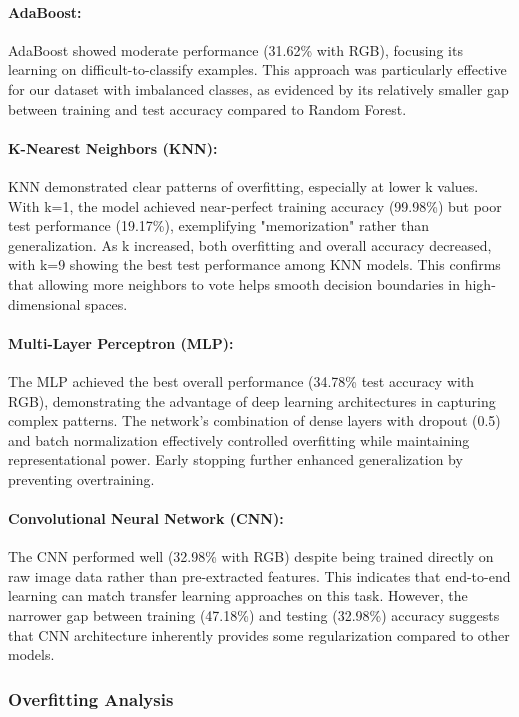 \documentclass{article}
\begin{document}
\paragraph{AdaBoost:}
AdaBoost showed moderate performance (31.62\% with RGB), focusing its learning on difficult-to-classify examples. This approach was particularly effective for our dataset with imbalanced classes, as evidenced by its relatively smaller gap between training and test accuracy compared to Random Forest.

\paragraph{K-Nearest Neighbors (KNN):}
KNN demonstrated clear patterns of overfitting, especially at lower k values. With k=1, the model achieved near-perfect training accuracy (99.98\%) but poor test performance (19.17\%), exemplifying "memorization" rather than generalization. As k increased, both overfitting and overall accuracy decreased, with k=9 showing the best test performance among KNN models. This confirms that allowing more neighbors to vote helps smooth decision boundaries in high-dimensional spaces.

\paragraph{Multi-Layer Perceptron (MLP):}
The MLP achieved the best overall performance (34.78\% test accuracy with RGB), demonstrating the advantage of deep learning architectures in capturing complex patterns. The network's combination of dense layers with dropout (0.5) and batch normalization effectively controlled overfitting while maintaining representational power. Early stopping further enhanced generalization by preventing overtraining.

\paragraph{Convolutional Neural Network (CNN):}
The CNN performed well (32.98\% with RGB) despite being trained directly on raw image data rather than pre-extracted features. This indicates that end-to-end learning can match transfer learning approaches on this task. However, the narrower gap between training (47.18\%) and testing (32.98\%) accuracy suggests that CNN architecture inherently provides some regularization compared to other models.

\subsubsection{Overfitting Analysis}
\end{document}
